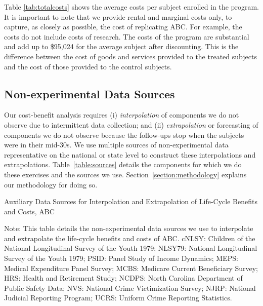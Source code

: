 \noindent Table \ref{tab:totalcosts} shows the average costs per subject enrolled
in the program. It is important to note that we provide rental and marginal costs only, to capture, as closely as possible, the cost of replicating ABC.  For example, the costs do not include costs of research. The costs of the program are substantial and add up to \$95,024 for the average subject after discounting. This is the difference between the cost of goods and services provided to the treated subjects and the cost of those provided to the control subjects. \\

\subsection{Non-experimental Data Sources}

\noindent Our cost-benefit analysis requires (i) \textit{interpolation} of components we do not observe due to intermittent data collection; and (ii) \textit{extrapolation} or forecasting of components we do not observe because the follow-ups stop when the subjects were in their mid-30s. We use multiple sources of non-experimental data representative on the national or state level to construct these interpolations and extrapolations. Table~\ref{table:sources} details the components for which we do these exercises and the sources we use. Section~\ref{section:methodology} explains our methodology for doing so. 

\begin{table}[H]
\begin{threeparttable}
\caption{Auxiliary Data Sources for Interpolation and Extrapolation of Life-Cycle Benefits and Costs, ABC} \label{table:sources}
\footnotesize

\begin{tablenotes}
\footnotesize
Note: This table details the non-experimental data sources we use to interpolate and extrapolate the life-cycle benefits and costs of ABC. cNLSY: Children of the National Longitudinal Survey of the Youth 1979; NLSY79: National Longitudinal Survey of the Youth 1979; PSID: Panel Study of Income Dynamics; MEPS: Medical Expenditure Panel Survey; MCBS: Medicare Current Beneficiary Survey; HRS: Health and Retirement Study; NCDPS: North Carolina Department of Public Safety Data; NVS: National Crime Victimization Survey; NJRP: National Judicial Reporting Program; UCRS: Uniform Crime Reporting Statistics.
\end{tablenotes}
\end{threeparttable}
\end{table}

